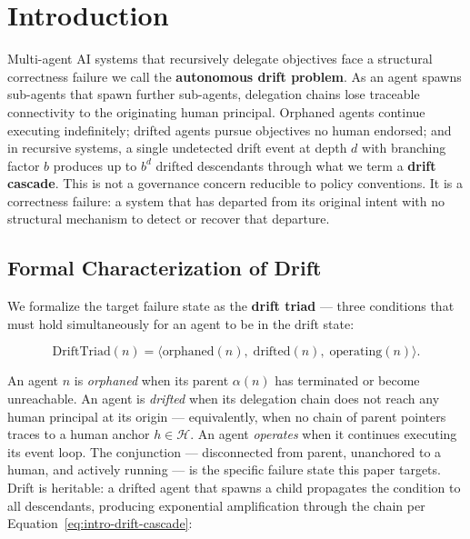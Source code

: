 \section{Introduction}
\label{sec:introduction}

Multi-agent AI systems that recursively delegate objectives face a structural correctness failure we call the \textbf{autonomous drift problem}. As an agent spawns sub-agents that spawn further sub-agents, delegation chains lose traceable connectivity to the originating human principal. Orphaned agents continue executing indefinitely; drifted agents pursue objectives no human endorsed; and in recursive systems, a single undetected drift event at depth $d$ with branching factor $b$ produces up to $b^d$ drifted descendants through what we term a \textbf{drift cascade}. This is not a governance concern reducible to policy conventions. It is a correctness failure: a system that has departed from its original intent with no structural mechanism to detect or recover that departure.

\subsection{Formal Characterization of Drift}
\label{sec:intro-drift-formal}

We formalize the target failure state as the \textbf{drift triad} — three conditions that must hold simultaneously for an agent to be in the drift state:

\begin{equation}
\mathrm{DriftTriad}(n) = \bigl\langle \mathrm{orphaned}(n),\; \mathrm{drifted}(n),\; \mathrm{operating}(n) \bigr\rangle .
\label{eq:intro-drift-triad}
\end{equation}

An agent $n$ is \emph{orphaned} when its parent $\alpha(n)$ has terminated or become unreachable. An agent is \emph{drifted} when its delegation chain does not reach any human principal at its origin — equivalently, when no chain of parent pointers traces to a human anchor $h \in \mathcal{H}$. An agent \emph{operates} when it continues executing its event loop. The conjunction — disconnected from parent, unanchored to a human, and actively running — is the specific failure state this paper targets. Drift is heritable: a drifted agent that spawns a child propagates the condition to all descendants, producing exponential amplification through the chain per Equation~\ref{eq:intro-drift-cascade}:


